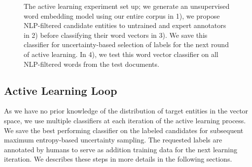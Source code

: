 \begin{figure}[!t]
\centering
{}
\caption{\label{fig:current} The active learning experiment set up; we generate an unsupervised word embedding model using our entire corpus in 1), we propose NLP-filtered candidate entities to untrained and expert annotators in 2) before classifying their word vectors in 3). We save this classifier for uncertainty-based selection of labels for the next round of active learning. In 4), we test this word vector classifier on all NLP-filtered words from the test documents. 
}
\end{figure}

\subsection{Active Learning Loop}
As we have no prior knowledge of the distribution of target entities in the vector space, 
we use multiple classifiers at each iteration of the active learning process. 
We save the best performing classifier on the labeled candidates for subsequent maximum entropy-based uncertainty sampling. 
The requested labels are annotated by humans to serve as addition training data for the next learning iteration. 
We describes these steps in more details in the following sections.

